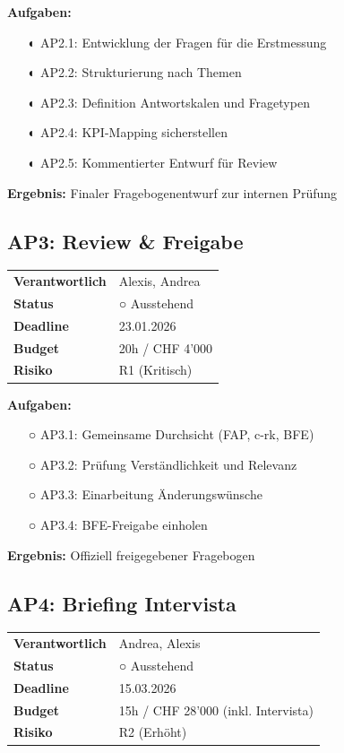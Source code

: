 \documentclass[11pt,a4paper]{article}
\begin{document}
\textbf{Aufgaben:}
\begin{itemize}[leftmargin=*]
    \item[◐] AP2.1: Entwicklung der Fragen für die Erstmessung
    \item[◐] AP2.2: Strukturierung nach Themen
    \item[◐] AP2.3: Definition Antwortskalen und Fragetypen
    \item[◐] AP2.4: KPI-Mapping sicherstellen
    \item[◐] AP2.5: Kommentierter Entwurf für Review
\end{itemize}

\textbf{Ergebnis:} Finaler Fragebogenentwurf zur internen Prüfung

\subsection{AP3: Review \& Freigabe}

\begin{table}[h]
\centering
\begin{tabular}{L{4cm}L{8cm}}
\toprule
\textbf{Verantwortlich} & Alexis, Andrea \\
\textbf{Status} & ○ Ausstehend \\
\textbf{Deadline} & 23.01.2026 \\
\textbf{Budget} & 20h / CHF 4'000 \\
\textbf{Risiko} & R1 (Kritisch) \\
\bottomrule
\end{tabular}
\end{table}

\textbf{Aufgaben:}
\begin{itemize}[leftmargin=*]
    \item[○] AP3.1: Gemeinsame Durchsicht (FAP, c-rk, BFE)
    \item[○] AP3.2: Prüfung Verständlichkeit und Relevanz
    \item[○] AP3.3: Einarbeitung Änderungswünsche
    \item[○] AP3.4: BFE-Freigabe einholen
\end{itemize}

\textbf{Ergebnis:} Offiziell freigegebener Fragebogen

\subsection{AP4: Briefing Intervista}

\begin{table}[h]
\centering
\begin{tabular}{L{4cm}L{8cm}}
\toprule
\textbf{Verantwortlich} & Andrea, Alexis \\
\textbf{Status} & ○ Ausstehend \\
\textbf{Deadline} & 15.03.2026 \\
\textbf{Budget} & 15h / CHF 28'000 (inkl. Intervista) \\
\textbf{Risiko} & R2 (Erhöht) \\
\bottomrule
\end{tabular}
\end{table}
\end{document}
